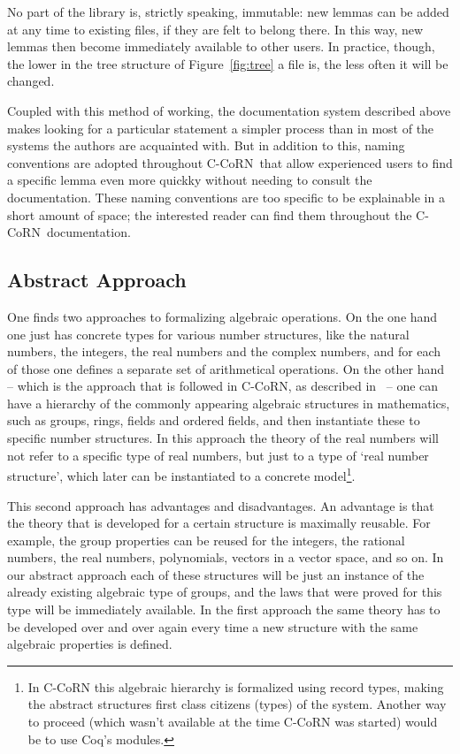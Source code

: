 \documentclass[runningheads]{llncs}
\newcommand{\ccorn}{\mbox{C-CoRN}}
\begin{document}
No part of the library is, strictly speaking, immutable: new
lemmas can be added at any time to existing files, if they are felt to belong
there.
In this way, new lemmas then become immediately available to other users.
In practice, though, the lower in the tree structure of Figure~\ref{fig:tree}
a file is, the less often it will be changed.

Coupled with this method of working, the documentation system described above
makes looking for a particular statement a simpler process than in most of the
systems the authors are acquainted with.
But in addition to this, naming conventions are adopted throughout
\ccorn\ that allow experienced users to find a specific lemma even
more quickky without needing to consult the documentation.
These naming conventions are too specific to be explainable in a
short amount of space; the interested reader can find them throughout
the \ccorn\ documentation.

\subsection*{Abstract Approach}

One finds two approaches to formalizing algebraic operations.  On the
one hand one just has concrete types for various number structures,
like the natural numbers, the integers, the real numbers and the
complex numbers, and for each of those one defines a separate set of
arithmetical operations.  On the other hand -- which is the approach
that is followed in {\ccorn}, as described in~\cite{geuvers2002} --
one can have a hierarchy of the commonly appearing algebraic
structures in mathematics, such as groups, rings, fields and ordered
fields, and then instantiate these to specific number structures.  In
this approach the theory of the real numbers will not refer to a
specific type of real numbers, but just to a type of `real number
structure', which later can be instantiated to a concrete
model\footnote{In {\ccorn} this algebraic hierarchy is formalized
using record types, making the abstract structures first class
citizens (types) of the system. Another way to proceed (which wasn't
available at the time {\ccorn} was started) would be to use Coq's
modules.}.

This second approach has advantages and disadvantages.
An advantage is that the theory that is developed for a certain
structure is maximally reusable.
For example, the group properties can be reused for the integers, 
the rational numbers, the real numbers, polynomials, vectors
in a vector space, and so on.
In our abstract approach each of these structures will
be just an instance of the already existing algebraic type of
groups,
and the laws that were proved for this type will be immediately available.
In the first approach the same theory has to be developed over and
over again every time a new structure with the same
algebraic properties is defined.
\end{document}
